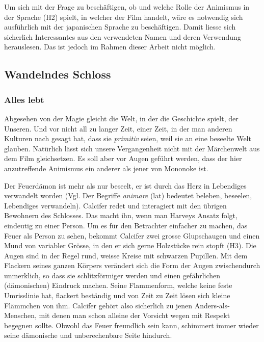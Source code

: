 Um sich mit der Frage zu beschäftigen, ob und welche Rolle der Animismus in der Sprache (H2) spielt, in welcher der Film handelt, wäre es notwendig sich ausführlich mit der japanischen Sprache zu beschäftigen. Damit liesse sich sicherlich Interessantes aus den verwendeten Namen und deren Verwendung herauslesen. Das ist jedoch im Rahmen dieser Arbeit nicht möglich. 

\subsection{Wandelndes Schloss} 
\subsubsection{Alles lebt} 
Abgesehen von der Magie gleicht die Welt, in der die Geschichte spielt, der Unseren. Und vor nicht all zu langer Zeit, einer Zeit, in der man anderen Kulturen nach gesagt hat, dass sie \emph{primitiv} seien, weil sie an eine beseelte Welt glauben. Natürlich lässt sich unsere Vergangenheit nicht mit der Märchenwelt aus dem Film gleichsetzen. Es soll aber vor Augen geführt werden, dass der hier anzutreffende Animismus ein anderer als jener von Mononoke ist. 

Der Feuerdämon ist mehr als nur beseelt, er ist durch das Herz in Lebendiges verwandelt worden (Vgl. Der Begriffe \emph{animare} (lat) bedeutet beleben, beseelen, Lebendiges verwandeln). Calcifer redet und interagiert mit den übrigen Bewohnern des Schlosses. Das macht ihn, wenn man Harveys Ansatz folgt, eindeutig zu einer Person. Um es für den Betrachter einfacher zu machen, das Feuer als Person zu sehen, bekommt Calcifer zwei grosse Glupschaugen und einen Mund von variabler Grösse, in den er sich gerne Holzstücke rein stopft (H3). Die Augen sind in der Regel rund, weisse Kreise mit schwarzen Pupillen. Mit dem Flackern seines ganzen Körpers verändert sich die Form der Augen zwischendurch unmerklich, so dass sie schlitzförmiger werden und einen gefährlichen (dämonischen) Eindruck machen. Seine Flammenform, welche keine feste Umrisslinie hat, flackert beständig und von Zeit zu Zeit lösen sich kleine Flämmchen von ihm. Calcifer gehört also sicherlich zu jenen Anders-als-Menschen, mit denen man schon alleine der Vorsicht wegen mit Respekt begegnen sollte. Obwohl das Feuer freundlich sein kann, schimmert immer wieder seine dämonische und unberechenbare Seite hindurch. 


